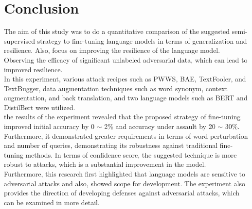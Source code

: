\documentclass[%
	BCOR=8mm, %
	DIV=12,
	toc=bibliography, %
	toc=listof, %
	oneside, %
	egregdoesnotlikesansseriftitles, %
	]{scrbook}
\begin{document}
\section{Conclusion}
\label{section:conclusion}
The aim of this study was to do a quantitative comparison of the suggested semi-supervised strategy to fine-tuning language models in terms of generalization and resilience. Also, focus on improving the resilience of the language model. Observing the efficacy of significant unlabeled adversarial data, which can lead to improved resilience.\\
 In this experiment, various attack recipes such as PWWS, BAE, TextFooler, and TextBugger, data augmentation techniques such as word synonym, context augmentation, and back translation, and two language models such as BERT and DistilBert were utilized.\\
the results of the experiment revealed that the proposed strategy of fine-tuning improved initial accuracy by 0 $\sim$ 2\% and accuracy under assault by 20 $\sim$ 30\%. Furthermore, it demonstrated greater requirements in terms of word perturbation and number of queries, demonstrating its robustness against traditional fine-tuning methods. In terms of confidence score, the suggested technique is more robust to attacks, which is a substantial improvement in the model.\\
Furthermore, this research first highlighted that language models are sensitive to adversarial attacks and also, showed scope for development. The experiment also provides the direction of developing defenses against adversarial attacks, which can be examined in more detail.





%
%
\printbibliography
\end{document}
